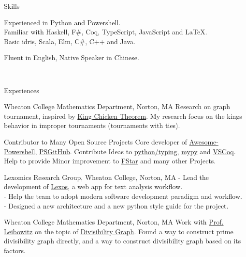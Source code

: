 \documentclass[]{resume-knyte}
\begin{document}
\begin{topic}{Skills}


    {Experienced in Python and Powershell.\\
    Familiar with Haskell, F\#, Coq, TypeScript, JavaScript and \LaTeX{}.\\
    Basic idris, Scala, Elm, C\#, C++ and Java.}

    {Fluent in English, Native Speaker in Chinese.}

    \\ %
\end{topic}


\begin{topic}{Experiences}


    {Wheaton College Mathematics Department, Norton, MA}
    {Research on graph tournament, inspired by \href{https://www.maa.org/sites/default/files/pdf/upload_library/22/Allendoerfer/1981/0025570x.di021114.02p00982.pdf}{King Chicken Theorem}.
    My research focus on the kings behavior in improper tournaments (tournaments with ties).}

    {Contributor to Many Open Source Projects}
    {Core developer of \href{https://github.com/janikvonrotz/awesome-powershell}{Awesome-Powershell}, \href{https://github.com/pcgeek86/PSGitHub}{PSGitHub}.
    Contribute Ideas to \href{https://github.com/python/typing}{python/typing}, \href{https://github.com/python/mypy}{mypy} and \href{https://github.com/siegebell/vscoq}{VSCoq}.
    Help to provide Minor improvement to \href{https://github.com/FStarLang/FStar}{FStar} and many other Projects.}

    {Lexomics Research Group, Wheaton College, Norton, MA}
    {- Lead the development of \href{https://github.com/WheatonCS/Lexos}{Lexos}, a web app for text analysis workflow.\\
    - Help the team to adopt modern software development paradigm and workflow.\\
    - Designed a new architecture and a new python style guide for the project.}

    {Wheaton College Mathematics Department, Norton, MA}
    {Work with \href{https://wheatoncollege.edu/academics/faculty-directory/rochelle-shelly-leibowitz/}{Prof. Leibowitz}
    on the topic of \href{https://chantisnake.github.io/2016/05/22/explain-the-divisibility-graph/}{Divisibility Graph}.
    Found a way to construct prime divisibility graph directly, and a way to construct divisibility graph based on its factors.}

\\ %
\end{topic}
\end{document}
